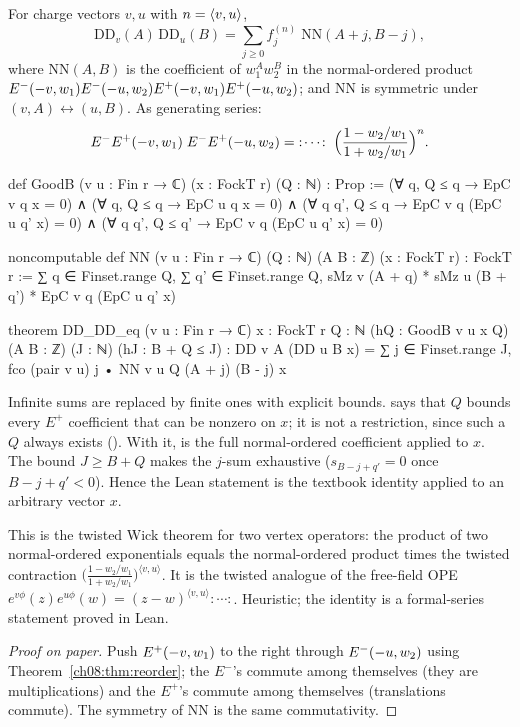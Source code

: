 \begin{theorem}\label{ch08:thm:twopoint}
For charge vectors $v,u$ with $n=\langle v,u\rangle$,
\begin{equation*}
  \mathrm{DD}_v(A)\,\mathrm{DD}_u(B)=\sum_{j\ge0}f^{(n)}_j\;\mathrm{NN}(A+j,B-j),
\end{equation*}
where $\mathrm{NN}(A,B)$ is the coefficient of $w_1^Aw_2^B$ in the normal-ordered product
$E^{-}(-v,w_1)E^{-}(-u,w_2)E^{+}(-v,w_1)E^{+}(-u,w_2)$; and
$\mathrm{NN}$ is symmetric under $(v,A)\leftrightarrow(u,B)$.  As generating series:
\begin{equation*}
  E^{-}E^{+}(-v,w_1)\;E^{-}E^{+}(-u,w_2)
  =\;:\!\cdots\!:\;\Bigl(\frac{1-w_2/w_1}{1+w_2/w_1}\Bigr)^{n}.
\end{equation*}
\end{theorem}
\begin{leancode}
def GoodB (v u : Fin r → ℂ) (x : FockT r) (Q : ℕ) : Prop :=
  (∀ q, Q ≤ q → EpC v q x = 0) ∧ (∀ q, Q ≤ q → EpC u q x = 0) ∧
    (∀ q q', Q ≤ q → EpC v q (EpC u q' x) = 0) ∧ (∀ q q', Q ≤ q' → EpC v q (EpC u q' x) = 0)

noncomputable def NN (v u : Fin r → ℂ) (Q : ℕ) (A B : ℤ) (x : FockT r) : FockT r :=
  ∑ q ∈ Finset.range Q, ∑ q' ∈ Finset.range Q,
    sMz v (A + q) * sMz u (B + q') * EpC v q (EpC u q' x)

theorem DD_DD_eq (v u : Fin r → ℂ) {x : FockT r} {Q : ℕ} (hQ : GoodB v u x Q) (A B : ℤ) (J : ℕ)
    (hJ : B + Q ≤ J) :
    DD v A (DD u B x) = ∑ j ∈ Finset.range J, fco (pair v u) j • NN v u Q (A + j) (B - j) x
\end{leancode}
\begin{dictionary}
Infinite sums are replaced by finite ones with explicit bounds.   says that
$Q$ bounds every $E^+$ coefficient that can be nonzero on $x$; it is not a restriction, since such
a $Q$ always exists ().  With it,  is the full
normal-ordered coefficient applied to $x$.  The bound $J\ge B+Q$ makes the $j$-sum exhaustive
($s_{B-j+q'}=0$ once $B-j+q'<0$).  Hence the Lean statement is the textbook identity applied to an
arbitrary vector $x$.
\end{dictionary}

\begin{physics}
This is the twisted Wick theorem for two vertex operators: the product of two normal-ordered exponentials equals the normal-ordered product times the twisted contraction $\bigl(\frac{1-w_2/w_1}{1+w_2/w_1}\bigr)^{\langle v,u\rangle}$. It is the twisted analogue of the free-field OPE $e^{v\phi}(z)e^{u\phi}(w)=(z-w)^{\langle v,u\rangle}:\!\cdots\!:$. Heuristic; the identity is a formal-series statement proved in Lean.
\end{physics}
\begin{proof}[Proof on paper]
Push $E^{+}(-v,w_1)$ to the right through $E^{-}(-u,w_2)$ using
Theorem~\ref{ch08:thm:reorder}; the $E^-$'s commute among themselves (they are multiplications) and
the $E^+$'s commute among themselves (translations commute).  The symmetry of $\mathrm{NN}$ is the
same commutativity.
\end{proof}

